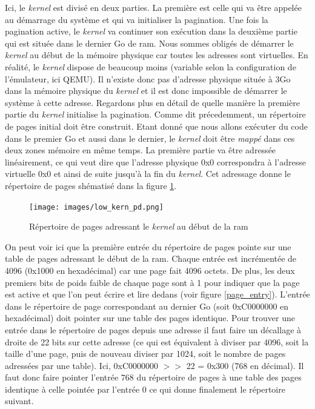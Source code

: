 Ici, le \textit{kernel} est divisé en deux parties. La première est celle qui va
être appelée au démarrage du système et qui va initialiser la pagination. Une fois
la pagination active, le \textit{kernel} va continuer son exécution dans la deuxième
partie qui est située dans le dernier Go de \acrshort{ram}. Nous sommes obligés de
démarrer le \textit{kernel} au début de la mémoire physique car toutes les adresses
sont virtuelles. En réalité, le \textit{kernel} dispose de beaucoup moins (variable
selon la configuration de l'émulateur, ici QEMU). Il n'existe donc pas d'adresse
physique située à 3Go dans la mémoire physique du \textit{kernel} et il est donc
impossible de démarrer le système à cette adresse. Regardons plus en détail de quelle
manière la première partie du \textit{kernel} initialise la pagination. Comme dit
précedemment, un répertoire de pages initial doit être construit. Etant donné que
nous allons exécuter du code dans le premier Go et aussi dans le dernier, le \textit{kernel}
doit être \textit{mappé} dans ces deux zones mémoire en même temps. La première
partie va être adressée linéairement, ce qui veut dire que l'adresse physique
0x0 correspondra à l'adresse virtuelle 0x0 et ainsi de suite jusqu'à la fin du
\textit{kernel}. Cet adressage donne le répertoire de pages shématisé dans la figure
\ref{low_kern_pd}.

\begin{figure}[!h]
  \centering
  \texttt{[image: images/low\_kern\_pd.png]}
  \caption{Répertoire de pages adressant le \textit{kernel} au début de la \acrshort{ram}}
  \label{low_kern_pd}
\end{figure}

On peut voir ici que la première entrée du répertoire de pages pointe sur une
table de pages adressant le début de la \acrshort{ram}. Chaque entrée est incrémentée
de 4096 (0x1000 en hexadécimal) car une page fait 4096 octets. De plus, les deux
premiers bits de poids faible de chaque page sont à 1 pour indiquer que la page est
active et que l'on peut écrire et lire dedans (voir figure \ref{page_entry}). L'entrée
dans le répertoire de page correspondant au dernier Go (soit 0xC0000000 en hexadécimal)
doit pointer sur une table des pages identique. Pour trouver une entrée dans le
répertoire de pages depuis une adresse il faut faire un décallage à droite de 22
bits sur cette adresse (ce qui est équivalent à diviser par 4096, soit la taille
d'une page, puis de nouveau diviser par 1024, soit le nombre de pages adressées par
une table). Ici, 0xC0000000 $>>$ 22 = 0x300 (768 en décimal). Il faut donc faire
pointer l'entrée 768 du répertoire de pages à une table des pages identique à
celle pointée par l'entrée 0 ce qui donne finalement le répertoire suivant.


